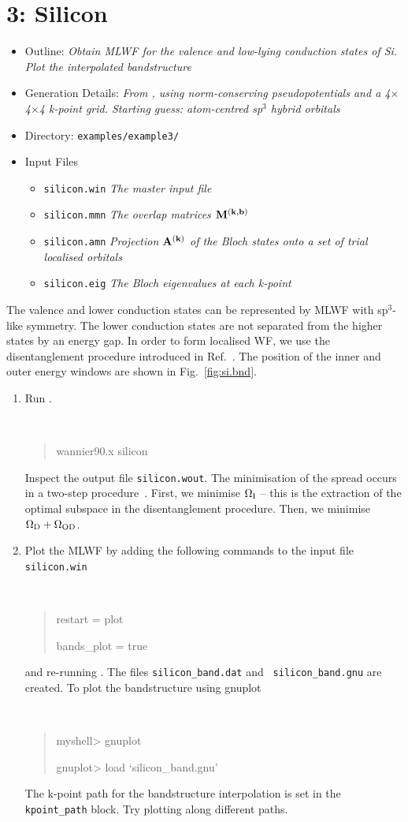 \documentclass[a4paper,11pt,twoside]{article}
\begin{document}
\cleardoublepage


\section*{3: Silicon}

\begin{itemize}
\item{Outline: \it{Obtain MLWF for the valence and low-lying
    conduction states of Si. Plot the interpolated bandstructure}} 
\item{Generation Details: \it{From \pwscf, using norm-conserving
    pseudopotentials and a 4$\times$4$\times$4 k-point grid. Starting
    guess: atom-centred sp$^3$ hybrid orbitals}} 
\item{Directory: {\tt examples/example3/}}
\item{Input Files}
\begin{itemize}
\item{ {\tt silicon.win}  {\it The master input file}}
\item{ {\tt silicon.mmn}  {\it The overlap matrices $\mathbf{M}^{(\mathbf{k},\mathbf{b})}$}}
\item{ {\tt silicon.amn}  {\it Projection $\mathbf{A}^{(\mathbf{k})}$ of the Bloch states onto a
    set of trial localised orbitals}} 
\item{ {\tt silicon.eig}  {\it The Bloch eigenvalues at each k-point}}
\end{itemize}
\end{itemize}
The valence and lower conduction states can be represented by MLWF
with sp$^3$-like symmetry. The lower conduction states are not 
separated from the higher states by an energy gap. In order to form
localised WF, we use the disentanglement procedure
introduced in Ref.~\cite{SMV}. The position of the inner and outer
energy windows are shown in Fig.~\ref{fig:si.bnd}. 
\begin{enumerate}
\item Run \wannier.
{\tt
\begin{quote}
wannier90.x silicon
\end{quote} }
Inspect the output file {\tt silicon.wout}. The minimisation of the
spread occurs in a two-step procedure~\cite{SMV}. First, we minimise
$\Omega_{\rm I}$ -- this is the extraction of the optimal subspace in
the disentanglement procedure. Then, we minimise $\Omega_{\rm D} +
\Omega_{{\rm OD}}$.

\item Plot the MLWF by adding the following commands to
  the input file {\tt silicon.win} 
{\tt
\begin{quote}
restart = plot

bands\_plot = true
\end{quote} }
and re-running \wannier. The files {\tt silicon\_band.dat} and {\tt
  silicon\_band.gnu} are created. 
To plot the bandstructure using gnuplot
\smallskip
{\tt
\begin{quote}
myshell> gnuplot

gnuplot> load `silicon\_band.gnu'
\end{quote} }
The k-point path for the bandstructure interpolation is set in the {\tt
  kpoint\_path} block. Try plotting along different paths. 
\end{enumerate}
\end{document}
